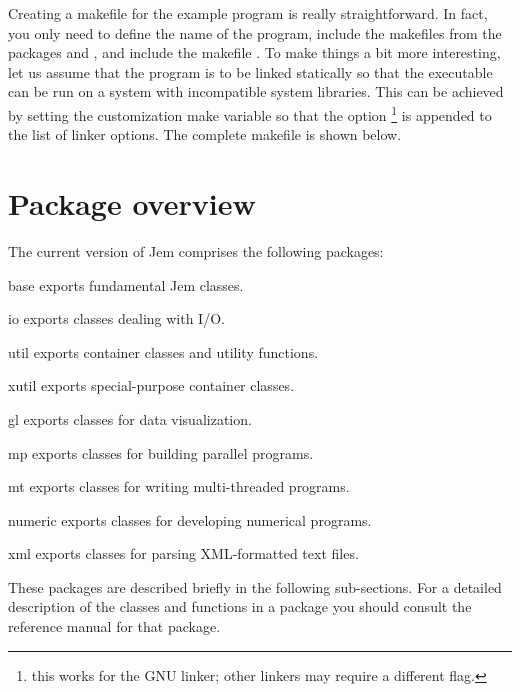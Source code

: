 \documentclass[a4paper,10pt]{article}
\begin{document}
Creating a makefile for the example program is really straightforward.
In fact, you only need to define the name of the program, include the
makefiles from the packages  and , and include the
makefile . To make things a bit more interesting, let us
assume that the program is to be linked statically so that the
executable can be run on a system with incompatible system libraries.
This can be achieved by setting the customization make variable
 so that the option
\footnote{this works for the GNU linker; other linkers
  may require a different flag.} is appended to the list of linker
options. The complete makefile is shown below.


\appendix


\section{Package overview \label{section:package-overview}}

The current version of Jem comprises the following packages:
\begin{Description}[\Code]

\item[base]  exports fundamental Jem classes.

\item[io]    exports classes dealing with I/O.

\item[util]  exports container classes and utility functions.

\item[xutil] exports special-purpose container classes.

\item[gl]    exports classes for data visualization.

\item[mp]    exports classes for building parallel programs.

\item[mt]    exports classes for writing multi-threaded programs.

\item[numeric]
             exports classes for developing numerical programs.

\item[xml]   exports classes for parsing XML-formatted text files.

\end{Description}
These packages are described briefly in the following sub-sections. For a
detailed description of the classes and functions in a package you should
consult the reference manual for that package.
\end{document}
